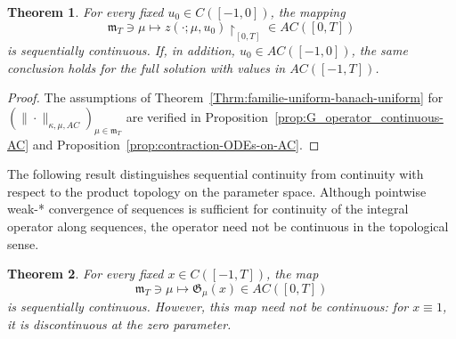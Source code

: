 \documentclass[reqno]{amsart}
\theoremstyle{plain}
\newtheorem{theorem}{Theorem}[section]
\numberwithin{equation}{section}
\numberwithin{definition}{section}
\begin{document}
\begin{theorem} For every fixed $u_0\in C([-1,0])$, the mapping
\begin{equation*}
    \mathfrak{m}_T\ni\mu
    \mapsto z(\cdot;\mu,u_0){\restriction}_{[0,T]}
    \in AC([0,T])
\end{equation*}
is sequentially continuous.
If, in addition, $u_0\in AC([-1,0])$, the same conclusion
holds for the full solution with values in $AC([-1,T])$.
\end{theorem}
\begin{proof}
The assumptions of Theorem~\ref{Thrm:familie-uniform-banach-uniform} for $(\| \cdot \|_{\kappa,\mu, AC})_{\mu\in \mathfrak{m}_T}$ are verified in 
    Proposition~\ref{prop:G_operator_continuous-AC}  and   Proposition~\ref{prop:contraction-ODEs-on-AC}. 
\end{proof}

The following result distinguishes sequential continuity from
continuity with respect to the product topology on the parameter
space. Although pointwise weak-* convergence of sequences is
sufficient for continuity of the integral operator along sequences,
the operator need not be continuous in the topological sense.

\begin{theorem}
For every fixed $x\in C([-1,T])$, the map
\begin{equation*}
    \mathfrak m_T\ni\mu
    \mapsto \mathfrak{G}_\mu (x)\in AC([0,T])
\end{equation*}
is sequentially continuous. However, this map need not be
continuous: for $x\equiv 1$, it is discontinuous at the zero
parameter.
\end{theorem}
\end{document}
